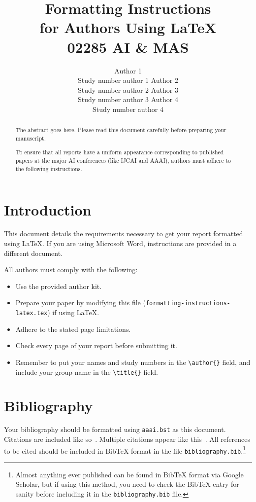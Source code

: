 \documentclass[letterpaper]{article}
\begin{document}
\title{Formatting Instructions \\for Authors Using \LaTeX{} \\ 02285 AI \& MAS}
\author{Author 1 \\ Study number author 1 \And Author 2 \\ Study number author 2 \And Author 3 \\ Study number author 3 \And Author 4 \\ Study number author 4}
\maketitle
\begin{abstract}
The abstract goes here. Please read this document carefully before preparing your manuscript.

To ensure that all reports have a uniform appearance corresponding to published papers at the major AI conferences (like IJCAI and AAAI), authors must adhere to the following instructions. 
\end{abstract}

\section{Introduction}
This document details the requirements necessary to get your report formatted using \LaTeX{}. If you are using Microsoft Word, instructions are provided in a different document. 

All authors must comply with the following:

\begin{itemize}
\item Use the provided author kit.
\item Prepare your paper by modifying this file (\texttt{formatting-instructions-latex.tex}) if using \LaTeX{}.
\item Adhere to the stated page limitations.
\item Check every page of your report before submitting it.
\item Remember to put your names and study numbers in the \verb|\author{}| field, and include your group name in the \verb|\title{}| field.
\end{itemize}

\section{Bibliography}
Your bibliography should be formatted using \texttt{aaai.bst} as this document. Citations are included like so~\cite{book2015}. Multiple citations appear like this~\cite{conf,article}. All references to be cited should be included in BibTeX format in the file \texttt{bibliography.bib}.\footnote{Almost anything ever published can be found in BibTeX format via Google Scholar, but if using this method, you need to check the BibTeX entry for sanity before including it in the \texttt{bibliography.bib} file.}
\end{document}
